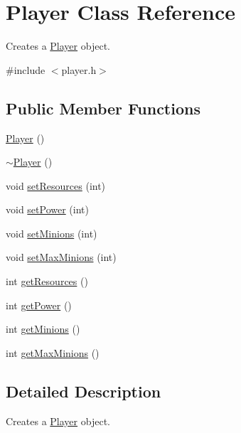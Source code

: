 \hypertarget{class_player}{\section{Player Class Reference}
\label{class_player}
}


Creates a \hyperlink{class_player}{Player} object.  




{\ttfamily \#include $<$player.\+h$>$}

\subsection*{Public Member Functions}
\begin{DoxyCompactItemize}
\item 
\hyperlink{class_player_affe0cc3cb714f6deb4e62f0c0d3f1fd8}{Player} ()
\item 
\hyperlink{class_player_a749d2c00e1fe0f5c2746f7505a58c062}{$\sim$\+Player} ()
\item 
void \hyperlink{class_player_aff31d77f567d626635cb7ba85c32dca2}{set\+Resources} (int)
\item 
void \hyperlink{class_player_a73f33ca00cc6565617f7a1c4246abdd1}{set\+Power} (int)
\item 
void \hyperlink{class_player_aa9d9f66e7d43c5ceaa5b3686e45406bb}{set\+Minions} (int)
\item 
void \hyperlink{class_player_a6fb31b221607f6fd9bb974554c120483}{set\+Max\+Minions} (int)
\item 
int \hyperlink{class_player_ac490c43e4a19418771dc448e71e00044}{get\+Resources} ()
\item 
int \hyperlink{class_player_a9ccd486aecc86f5ad1d2a819293437f9}{get\+Power} ()
\item 
int \hyperlink{class_player_a64cf326408edb0841c92f2e531dba3d5}{get\+Minions} ()
\item 
int \hyperlink{class_player_a7fcbf1e4bd1319f43bacd0140b8749f5}{get\+Max\+Minions} ()
\end{DoxyCompactItemize}


\subsection{Detailed Description}
Creates a \hyperlink{class_player}{Player} object. 


